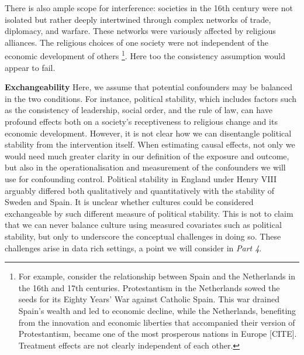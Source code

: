 \documentclass[
  singlecolumn]{report}
\begin{document}
There is also ample scope for interference: societies in the 16th
century were not isolated but rather deeply intertwined through complex
networks of trade, diplomacy, and warfare. These networks were variously
affected by religious alliances. The religious choices of one society
were not independent of the economic development of others \footnote{For
  example, consider the relationship between Spain and the Netherlands
  in the 16th and 17th centuries. Protestantism in the Netherlands sowed
  the seeds for its Eighty Years' War against Catholic Spain. This war
  drained Spain's wealth and led to economic decline, while the
  Netherlands, benefiting from the innovation and economic liberties
  that accompanied their version of Protestantism, became one of the
  most prosperous nations in Europe {[}CITE{]}. Treatment effects are
  not clearly independent of each other.}. Here too the consistency
assumption would appear to fail.

\textbf{Exchangeability} Here, we assume that potential confounders may
be balanced in the two conditions. For instance, political stability,
which includes factors such as the consistency of leadership, social
order, and the rule of law, can have profound effects both on a
society's receptiveness to religious change and its economic
development. However, it is not clear how we can disentangle political
stability from the intervention itself. When estimating causal effects,
not only we would need much greater clarity in our definition of the
exposure and outcome, but also in the operationalisation and measurement
of the confounders we will use for confounding control. Political
stability in England under Henry VIII arguably differed both
qualitatively and quantitatively with the stability of Sweden and Spain.
It is unclear whether cultures could be considered exchangeable by such
different measure of political stability. This is not to claim that we
can never balance culture using measured covariates such as political
stability, but only to underscore the conceptual challenges in doing so.
These challenges arise in data rich settings, a point we will consider
in \emph{Part 4}.
\end{document}
